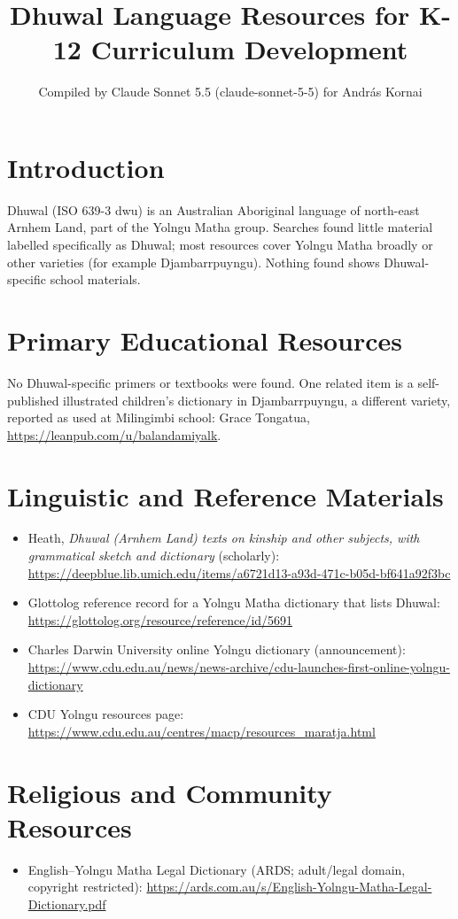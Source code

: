 \documentclass[12pt]{article}
\title{Dhuwal Language Resources for K-12 Curriculum Development}
\author{Compiled by Claude Sonnet 5.5 (claude-sonnet-5-5) for Andr\'as Kornai}
\date{}
\begin{document}
\maketitle

\section{Introduction}
Dhuwal (ISO 639-3 dwu) is an Australian Aboriginal language of north-east Arnhem Land, part of the Yolngu Matha group. Searches found little material labelled specifically as Dhuwal; most resources cover Yolngu Matha broadly or other varieties (for example Djambarrpuyngu). Nothing found shows Dhuwal-specific school materials.

\section{Primary Educational Resources}
No Dhuwal-specific primers or textbooks were found. One related item is a self-published illustrated children's dictionary in Djambarrpuyngu, a different variety, reported as used at Milingimbi school: Grace Tongatua, \url{https://leanpub.com/u/balandamiyalk}.

\section{Linguistic and Reference Materials}
\begin{itemize}
\item Heath, \emph{Dhuwal (Arnhem Land) texts on kinship and other subjects, with grammatical sketch and dictionary} (scholarly): \url{https://deepblue.lib.umich.edu/items/a6721d13-a93d-471c-b05d-bf641a92f3bc}
\item Glottolog reference record for a Yolngu Matha dictionary that lists Dhuwal: \url{https://glottolog.org/resource/reference/id/5691}
\item Charles Darwin University online Yolngu dictionary (announcement): \url{https://www.cdu.edu.au/news/news-archive/cdu-launches-first-online-yolngu-dictionary}
\item CDU Yolngu resources page: \url{https://www.cdu.edu.au/centres/macp/resources_maratja.html}
\end{itemize}

\section{Religious and Community Resources}
\begin{itemize}
\item English--Yolngu Matha Legal Dictionary (ARDS; adult/legal domain, copyright restricted): \url{https://ards.com.au/s/English-Yolngu-Matha-Legal-Dictionary.pdf}
\end{itemize}
\end{document}
